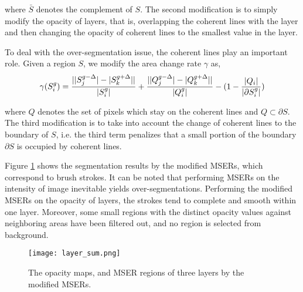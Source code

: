 where $ \bar{S} $ denotes the complement of $S$. The second modification is to simply modify the opacity of layers, that is, overlapping the coherent lines with the layer and then changing the opacity of coherent lines to the smallest value in the layer.

To deal with the over-segmentation issue, the coherent lines play an important role. Given a region $S$, we modify the area change rate $\gamma$ as,
\begin{equation}
\gamma(S_i^g)=\frac{  \lvert \lvert S_j^{g-\Delta}\rvert -\lvert S_k^{g+\Delta} \rvert
	 \rvert     }{\arrowvert S_i^g\arrowvert} + \frac{  \lvert \lvert Q_j^{g-\Delta}\rvert -\lvert Q_k^{g+\Delta} \rvert
	 \rvert     }{\arrowvert Q_i^g\arrowvert} - (1-\frac{\lvert Q_i\rvert}{\lvert \partial S_i^g \rvert} )
\end{equation}


where $Q$ denotes the set of pixels which stay on the coherent lines and $Q \subset \partial S $. The third modification is to take into account the change of coherent lines to the boundary of $S$, i.e. the third term penalizes that a small portion of the boundary $\partial S$ is occupied by coherent lines.

Figure \ref{mser:alpha} shows the segmentation results by the modified MSERs, which correspond to brush strokes. It can be noted that performing MSERs on the intensity of image inevitable yields over-segmentations. Performing the modified MSERs on the opacity of layers, the strokes tend to complete and smooth within one layer. Moreover, some small regions with the distinct opacity values against neighboring areas have been filtered out, and no region is selected from background. 
\begin{figure}[H]
	\centering 
	\texttt{[image: layer\_sum.png]}
	\caption{The opacity maps, and MSER regions of three layers by the modified MSERs.}
	\label{mser:alpha}
\end{figure}

